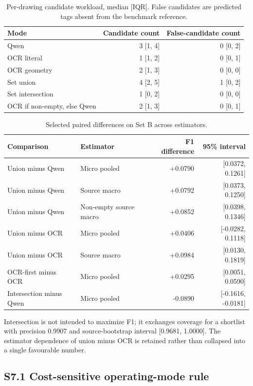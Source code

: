 \documentclass[11pt]{article}
\begin{document}
\begin{table}[H]
\centering
\caption{Per-drawing candidate workload, median [IQR]. False candidates are
predicted tags absent from the benchmark reference.}
\label{tab:s7_workload}
\small
\begin{tabular}{lrr}
\toprule
Mode & Candidate count & False-candidate count \\
\midrule
Qwen & 3 [1, 4] & 0 [0, 2] \\
OCR literal & 1 [1, 2] & 0 [0, 1] \\
OCR geometry & 2 [1, 3] & 0 [0, 0] \\
Set union & 4 [2, 5] & 1 [0, 2] \\
Set intersection & 1 [0, 2] & 0 [0, 0] \\
OCR if non-empty, else Qwen & 2 [1, 3] & 0 [0, 1] \\
\bottomrule
\end{tabular}
\end{table}

\begin{table}[H]
\centering
\caption{Selected paired differences on Set B across estimators.}
\label{tab:s7_diffs}
\scriptsize
\begin{tabular}{llrr}
\toprule
Comparison & Estimator & F1 difference & 95\% interval \\
\midrule
Union minus Qwen & Micro pooled & +0.0790 & [0.0372, 0.1261] \\
Union minus Qwen & Source macro & +0.0792 & [0.0373, 0.1250] \\
Union minus Qwen & Non-empty source macro & +0.0852 & [0.0398, 0.1346] \\
Union minus OCR & Micro pooled & +0.0406 & [-0.0282, 0.1118] \\
Union minus OCR & Source macro & +0.0984 & [0.0130, 0.1819] \\
OCR-first minus OCR & Micro pooled & +0.0295 & [0.0051, 0.0590] \\
Intersection minus Qwen & Micro pooled & -0.0890 & [-0.1616, -0.0181] \\
\bottomrule
\end{tabular}
\end{table}

Intersection is not intended to maximize F1; it exchanges coverage for a
shortlist with precision 0.9907 and source-bootstrap interval
[0.9681, 1.0000]. The estimator dependence of union minus OCR is retained
rather than collapsed into a single favourable number.

\subsection*{S7.1 Cost-sensitive operating-mode rule}
\end{document}
